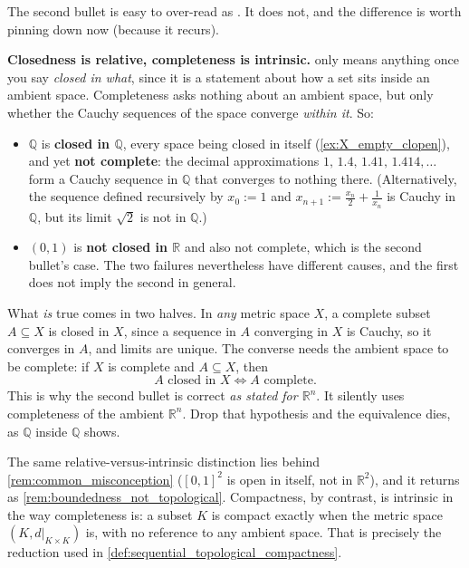 \begin{remark}
\label{rem:complete_vs_closed}
The second bullet is easy to over-read as . It does not, and the
difference is worth pinning down now (because it recurs).

\textbf{Closedness is relative, completeness is intrinsic.}  only means anything once
you say \emph{closed in what}, since it is a statement about how a set sits inside an ambient
space. Completeness asks nothing about an ambient space, but only whether the Cauchy sequences of
the space converge \emph{within it}. So:
\begin{itemize}
  \item $\mathbb{Q}$ is \textbf{closed in $\mathbb{Q}$}, every space being closed in itself
    (\cref{ex:X_empty_clopen}), and yet \textbf{not complete}: the decimal approximations
    $1,\,1.4,\,1.41,\,1.414,\dots$ form a Cauchy sequence in $\mathbb{Q}$ that converges to nothing there.
    (Alternatively, the sequence defined recursively by $x_0 := 1$ and $x_{n+1} := \frac{x_n}{2} + \frac{1}{x_n}$
    is Cauchy in $\mathbb{Q}$, but its limit $\sqrt{2}$ is not in $\mathbb{Q}$.)
  \item $(0,1)$ is \textbf{not closed in $\mathbb{R}$} and also not complete, which is the
    second bullet's case. The two failures nevertheless have different causes, and the first does
    not imply the second in general.
\end{itemize}

What \emph{is} true comes in two halves. In \emph{any} metric space $X$, a complete subset
$A \subseteq X$ is closed in $X$, since a sequence in $A$ converging in $X$ is Cauchy, so it
converges in $A$, and limits are unique. The converse needs the ambient space to be complete: if
$X$ is complete and $A \subseteq X$, then
\[A \text{ closed in } X \iff A \text{ complete}.\]
This is why the second bullet is correct \emph{as stated for $\mathbb{R}^n$}. It silently uses
completeness of the ambient $\mathbb{R}^n$. Drop that hypothesis and the equivalence dies, as
$\mathbb{Q}$ inside $\mathbb{Q}$ shows.

The same relative-versus-intrinsic distinction lies behind \cref{rem:common_misconception}
($[0,1]^2$ is open in itself, not in $\mathbb{R}^2$), and it returns as
\cref{rem:boundedness_not_topological}. Compactness, by contrast, is intrinsic in the way
completeness is: a subset $K$ is compact exactly when the metric space $(K, d|_{K\times K})$ is,
with no reference to any ambient space. That is precisely the reduction used in
\cref{def:sequential_topological_compactness}.
\end{remark}

